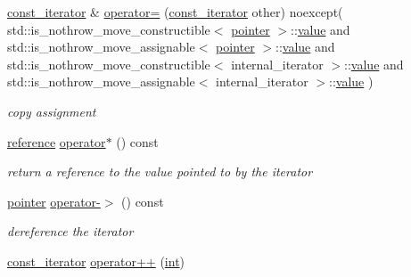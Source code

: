 \begin{DoxyCompactItemize}
\hyperlink{classnlohmann_1_1basic__json_1_1const__iterator}{const\+\_\+iterator} \& \hyperlink{classnlohmann_1_1basic__json_1_1const__iterator_a5521515067b6597cb0b55a9c547a7a2b}{operator=} (\hyperlink{classnlohmann_1_1basic__json_1_1const__iterator}{const\+\_\+iterator} other) noexcept(                                       std\+::is\+\_\+nothrow\+\_\+move\+\_\+constructible$<$ \hyperlink{classnlohmann_1_1basic__json_1_1const__iterator_a1da96fc3054d547e7706d3a2f073f389}{pointer} $>$\+::\hyperlink{tk_8h_a177a0765f574ef6642002696d9cd82d0}{value} and                                       std\+::is\+\_\+nothrow\+\_\+move\+\_\+assignable$<$ \hyperlink{classnlohmann_1_1basic__json_1_1const__iterator_a1da96fc3054d547e7706d3a2f073f389}{pointer} $>$\+::\hyperlink{tk_8h_a177a0765f574ef6642002696d9cd82d0}{value} and                                       std\+::is\+\_\+nothrow\+\_\+move\+\_\+constructible$<$ internal\+\_\+iterator $>$\+::\hyperlink{tk_8h_a177a0765f574ef6642002696d9cd82d0}{value} and                                       std\+::is\+\_\+nothrow\+\_\+move\+\_\+assignable$<$ internal\+\_\+iterator $>$\+::\hyperlink{tk_8h_a177a0765f574ef6642002696d9cd82d0}{value}                       )
\begin{DoxyCompactList}\small\item\em copy assignment \end{DoxyCompactList}\item 
\hyperlink{classnlohmann_1_1basic__json_1_1const__iterator_aefd248cac6493eed1e6ff53ba6a63eb2}{reference} \hyperlink{classnlohmann_1_1basic__json_1_1const__iterator_ab3029a1a83cf46dc28ad443bbad0c74d}{operator$\ast$} () const 
\begin{DoxyCompactList}\small\item\em return a reference to the value pointed to by the iterator \end{DoxyCompactList}\item 
\hyperlink{classnlohmann_1_1basic__json_1_1const__iterator_a1da96fc3054d547e7706d3a2f073f389}{pointer} \hyperlink{classnlohmann_1_1basic__json_1_1const__iterator_a8be837e4d902887676dd837abe9098d3}{operator-\/$>$} () const 
\begin{DoxyCompactList}\small\item\em dereference the iterator \end{DoxyCompactList}\item 
\hyperlink{classnlohmann_1_1basic__json_1_1const__iterator}{const\+\_\+iterator} \hyperlink{classnlohmann_1_1basic__json_1_1const__iterator_a8dbaec5bf8ccba3225520356629061cb}{operator++} (\hyperlink{tk_8h_a83f82f76e7fed06f4c49d2db94028a6d}{int})

\end{DoxyCompactItemize}
